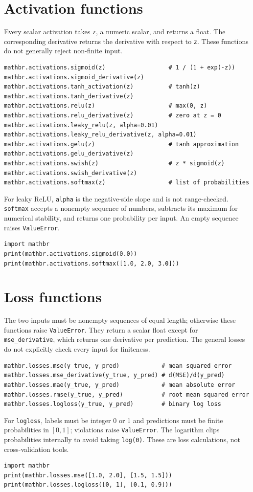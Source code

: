 \documentclass[11pt,a4paper]{article}
\begin{document}
\section{Activation functions}
Every scalar activation takes \verb|z|, a numeric scalar, and returns a float. The corresponding derivative returns the derivative with respect to \verb|z|. These functions do not generally reject non-finite input.
\begin{verbatim}
mathbr.activations.sigmoid(z)                  # 1 / (1 + exp(-z))
mathbr.activations.sigmoid_derivative(z)
mathbr.activations.tanh_activation(z)          # tanh(z)
mathbr.activations.tanh_derivative(z)
mathbr.activations.relu(z)                     # max(0, z)
mathbr.activations.relu_derivative(z)          # zero at z = 0
mathbr.activations.leaky_relu(z, alpha=0.01)
mathbr.activations.leaky_relu_derivative(z, alpha=0.01)
mathbr.activations.gelu(z)                     # tanh approximation
mathbr.activations.gelu_derivative(z)
mathbr.activations.swish(z)                    # z * sigmoid(z)
mathbr.activations.swish_derivative(z)
mathbr.activations.softmax(z)                  # list of probabilities
\end{verbatim}
For leaky ReLU, \verb|alpha| is the negative-side slope and is not range-checked. \verb|softmax| accepts a nonempty sequence of numbers, subtracts its maximum for numerical stability, and returns one probability per input. An empty sequence raises \verb|ValueError|.
\begin{verbatim}
import mathbr
print(mathbr.activations.sigmoid(0.0))
print(mathbr.activations.softmax([1.0, 2.0, 3.0]))
\end{verbatim}

\section{Loss functions}
The two inputs must be nonempty sequences of equal length; otherwise these functions raise \verb|ValueError|. They return a scalar float except for \verb|mse_derivative|, which returns one derivative per prediction. The general losses do not explicitly check every input for finiteness.
\begin{verbatim}
mathbr.losses.mse(y_true, y_pred)            # mean squared error
mathbr.losses.mse_derivative(y_true, y_pred) # d(MSE)/d(y_pred)
mathbr.losses.mae(y_true, y_pred)            # mean absolute error
mathbr.losses.rmse(y_true, y_pred)           # root mean squared error
mathbr.losses.logloss(y_true, y_pred)        # binary log loss
\end{verbatim}
For \verb|logloss|, labels must be integer 0 or 1 and predictions must be finite probabilities in $[0,1]$; violations raise \verb|ValueError|. The logarithm clips probabilities internally to avoid taking \verb|log(0)|. These are loss calculations, not cross-validation tools.
\begin{verbatim}
import mathbr
print(mathbr.losses.mse([1.0, 2.0], [1.5, 1.5]))
print(mathbr.losses.logloss([0, 1], [0.1, 0.9]))
\end{verbatim}
\end{document}
